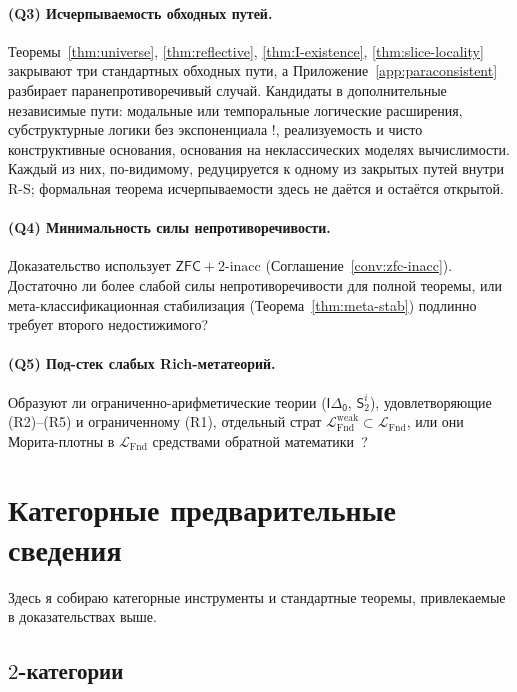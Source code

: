 \documentclass[11pt]{article}
\theoremstyle{plain}
\theoremstyle{definition}
\newcommand{\LFnd}{\mathcal{L}_{\mathrm{Fnd}}}
\newcommand{\ZFC}{\mathsf{ZFC}}
\begin{document}
\paragraph{(Q3) Исчерпываемость обходных путей.} Теоремы~\ref{thm:universe}, \ref{thm:reflective}, \ref{thm:I-existence}, \ref{thm:slice-locality} закрывают три стандартных обходных пути, а Приложение~\ref{app:paraconsistent} разбирает паранепротиворечивый случай. Кандидаты в дополнительные независимые пути: модальные или темпоральные логические расширения, субструктурные логики без экспоненциала $!$, реализуемость и чисто конструктивные основания, основания на неклассических моделях вычислимости. Каждый из них, по-видимому, редуцируется к одному из закрытых путей внутри R-S; формальная теорема исчерпываемости здесь не даётся и остаётся открытой.

\paragraph{(Q4) Минимальность силы непротиворечивости.} Доказательство использует $\ZFC + 2\text{-inacc}$ (Соглашение~\ref{conv:zfc-inacc}). Достаточно ли более слабой силы непротиворечивости для полной теоремы, или мета-классификационная стабилизация (Теорема~\ref{thm:meta-stab}) подлинно требует второго недостижимого?

\paragraph{(Q5) Под-стек слабых Rich-метатеорий.} Образуют ли ограниченно-арифметические теории ($\mathsf{I\Delta_0}$, $\mathsf{S}_2^i$), удовлетворяющие (R2)--(R5) и ограниченному (R1), отдельный страт $\LFnd^{\mathrm{weak}} \subset \LFnd$, или они Морита-плотны в $\LFnd$ средствами обратной математики~\cite{Simpson2009}?

\appendix

\section{Категорные предварительные сведения}\label{app:categorical}

Здесь я собираю категорные инструменты и стандартные теоремы, привлекаемые в доказательствах выше.

\subsection{\texorpdfstring{$2$-категории}{2-категории}}
\end{document}
